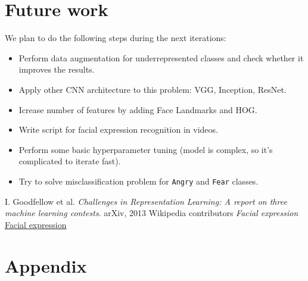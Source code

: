 \section{Future work}

We plan to do the following steps during the next iterations:

\begin{itemize}
	\item 
	Perform data augmentation for underrepresented classes and check whether it improves the results.
	\item 
	Apply other CNN architecture to this problem: VGG, Inception, ResNet.
	\item 
	Icrease number of features by adding Face Landmarks and HOG.
	\item 
	Write script for facial expression recognition in videos.
	\item 
	Perform some basic hyperparameter tuning (model is complex, so it's complicated to iterate fast).
	\item 
	Try to solve misclassification problem for \texttt{Angry} and \texttt{Fear} classes.
\end{itemize}


\newpage
\begin{thebibliography}{6}
	I. Goodfellow et al.
	\textit{Challenges in Representation Learning: A report on three machine learning
		contests}. 
	arXiv, 2013
	Wikipedia contributors
	\textit{Facial expression}
	\href{https://en.wikipedia.org/wiki/Facial_expression}{Facial expression}
	


\end{thebibliography}

\newpage
\appendix
\section{Appendix}

